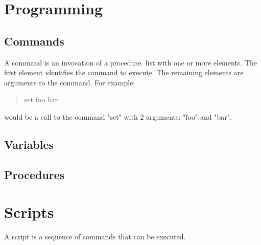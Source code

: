 \documentclass[10pt]{book}
\newcommand{\Example}[1]{{\begin{quote} \colorbox{lgray}{\parbox{5in}{\ttfamily #1}} \end{quote}}}
\begin{document}
\section{Programming}

%
%

\subsection{Commands}

A command is an invocation of a procedure. list with one or more elements.  The first element identifies the command to execute.  The remaining elements are arguments to the command.  For example:
\Example{set foo bar}
would be a call to the command "set" with 2 arguments: "foo" and "bar".

\subsection{Variables}

\subsection{Procedures}

\section {Scripts}

A script is a sequence of commands that can be executed.
\end{document}
